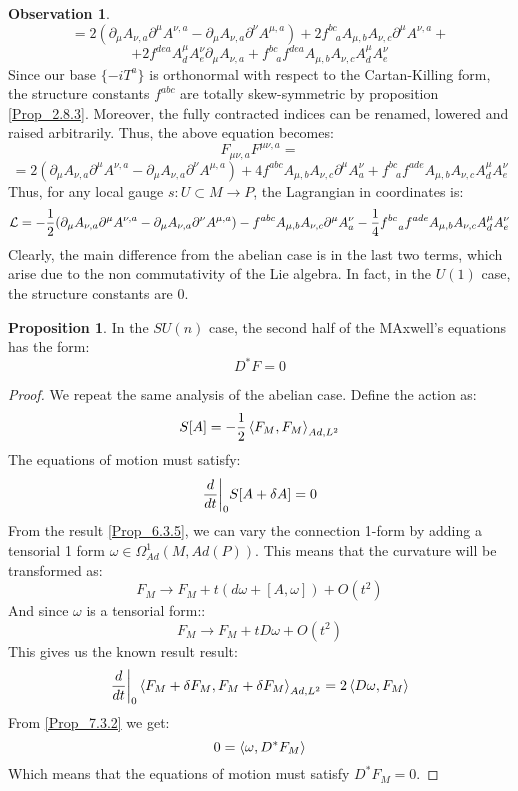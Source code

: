 \documentclass[12pt,a4paper]{report}
\theoremstyle{definition}
\theoremstyle{Theorem}
\newtheorem{Prop}[Def]{Proposition}
\theoremstyle{definition}
\theoremstyle{definition}
\newtheorem{Obs}[Def]{Observation}
\begin{document}
\begin{Obs}
		$$=2(\partial_\mu A_{\nu,a}\partial^\mu A^{\nu,a}-\partial_\mu A_{\nu,a}\partial^\nu A^{\mu,a})+2f^{bc}_{\hspace{9pt}a}A_{\mu,b}A_{\nu,c}\partial^\mu A^{\nu,a}+$$
		$$+2f^{dea}A^{\mu}_dA^{\nu}_e\partial_\mu A_{\nu,a}+f^{bc}_{\hspace{9pt}a}f^{dea}A_{\mu,b}A_{\nu,c}A^{\mu}_dA^{\nu}_e$$
		Since our base $\{-iT^a\}$ is orthonormal with respect to the Cartan-Killing form, the structure constants $f^{abc}$ are totally skew-symmetric by proposition \ref{Prop_2.8.3}. Moreover, the fully contracted indices can be renamed, lowered and raised arbitrarily. Thus, the above equation becomes:
		$$F_{\mu\nu,a}F^{\mu\nu,a}=$$
		$$=2(\partial_\mu A_{\nu,a}\partial^\mu A^{\nu,a}-\partial_\mu A_{\nu,a}\partial^\nu A^{\mu,a})+4f^{abc}A_{\mu,b}A_{\nu,c}\partial^\mu A^{\nu}_{a}+ f^{bc}_{\hspace{9pt}a}f^{ade}A_{\mu,b}A_{\nu,c}A^{\mu}_dA^{\nu}_e$$
		Thus, for any local gauge $s:U\subset M\rightarrow P$, the Lagrangian in coordinates is:
		$$\mathcal{L}=-{1\over 2}(\partial_\mu A_{\nu,a}\partial^\mu A^{\nu,a}-\partial_\mu A_{\nu,a}\partial^\nu A^{\mu,a})-f^{abc}A_{\mu,b}A_{\nu,c}\partial^\mu A^{\nu}_{a}-{1\over 4} f^{bc}_{\hspace{9pt}a}f^{ade}A_{\mu,b}A_{\nu,c}A^{\mu}_dA^{\nu}_e$$
		Clearly, the main difference from the abelian case is in the last two terms, which arise due to the non commutativity of the Lie algebra. In fact, in the $U(1)$ case, the structure constants are 0.
	\end{Obs}
	\begin{Prop}
		In the $SU(n)$ case, the second half of the MAxwell's equations has the form:
		$$D^*F=0$$
	\end{Prop}
	\begin{proof}
		We repeat the same analysis of the abelian case. Define the action as:
		$$S[A]=-{1\over 2}\braket{F_M,F_M}_{Ad,L^2}$$
		The equations of motion must satisfy:
		$${d\over dt}\bigg|_0S[A+\delta A]=0$$
		From the result \ref{Prop_6.3.5}, we can vary the connection 1-form by adding a tensorial 1 form $\omega\in\Omega^1_{Ad}(M,Ad(P))$. This means that the curvature will be transformed as:
		$$F_M\rightarrow F_M+t(d\omega+[A,\omega])+O(t^2)$$
		And since $\omega$ is a tensorial form::
		$$F_M\rightarrow F_M+tD\omega+O(t^2)$$
		This gives us the known result result:
		$${d\over dt}\bigg|_0\braket{F_M+\delta F_M,F_M+\delta F_M}_{Ad,L^2}=2\braket{D\omega,F_M}$$
		From \ref{Prop_7.3.2} we get:
		$$0=\braket{\omega,D^*F_M}$$
		Which means that the equations of motion must satisfy $D^*F_M=0$.
	\end{proof}
\end{document}
